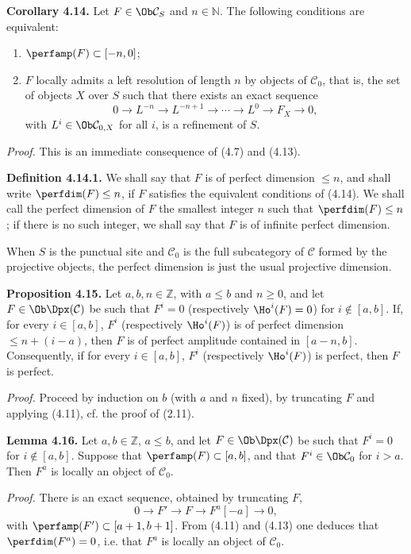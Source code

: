 \textbf{Corollary 4.14.} Let \(F\in\Ob\mathcal C_S\) and \(n\in\mathbb N\). The following conditions are equivalent:
\begin{enumerate}[label=(\roman*)]
\item \(\perfamp(F)\subset[-n,0]\);
\item \(F\) locally admits a left resolution of length \(n\) by objects of \(\mathcal C_0\), that is, the set of objects \(X\) over \(S\) such that there exists an exact sequence
\[
  0\longrightarrow L^{-n}\longrightarrow L^{-n+1}\longrightarrow \cdots
  \longrightarrow L^0\longrightarrow F_X\longrightarrow 0,
\]
with \(L^i\in\Ob\mathcal C_{0,X}\) for all \(i\), is a refinement of \(S\).
\end{enumerate}

\emph{Proof.} This is an immediate consequence of (4.7) and (4.13).

\textbf{Definition 4.14.1.} We shall say that \(F\) is of perfect dimension \(\leq n\), and shall write \(\perfdim(F)\leq n\), if \(F\) satisfies the equivalent conditions of (4.14). We shall call the perfect dimension of \(F\) the smallest integer \(n\) such that \(\perfdim(F)\leq n\); if there is no such integer, we shall say that \(F\) is of infinite perfect dimension.

When \(S\) is the punctual site and \(\mathcal C_0\) is the full subcategory of \(\mathcal C\) formed by the projective objects, the perfect dimension is just the usual projective dimension.

\textbf{Proposition 4.15.} Let \(a,b,n\in\mathbb Z\), with \(a\leq b\) and \(n\geq0\), and let \(F\in\Ob\Dpx(\mathcal C)\) be such that \(F^i=0\) (respectively \(\Ho^i(F)=0\)) for \(i\notin[a,b]\). If, for every \(i\in[a,b]\), \(F^i\) (respectively \(\Ho^i(F)\)) is of perfect dimension \(\leq n+(i-a)\), then \(F\) is of perfect amplitude contained in \([a-n,b]\). Consequently, if for every \(i\in[a,b]\), \(F^i\) (respectively \(\Ho^i(F)\)) is perfect, then \(F\) is perfect.

\emph{Proof.} Proceed by induction on \(b\) (with \(a\) and \(n\) fixed), by truncating \(F\) and applying (4.11), cf. the proof of (2.11).

\textbf{Lemma 4.16.} Let \(a,b\in\mathbb Z\), \(a\leq b\), and let \(F\in\Ob\Dpx(\mathcal C)\) be such that \(F^i=0\) for \(i\notin[a,b]\). Suppose that \(\perfamp(F)\subset[a,b]\), and that \(F^i\in\Ob\mathcal C_0\) for \(i>a\). Then \(F^a\) is locally an object of \(\mathcal C_0\).

\emph{Proof.} There is an exact sequence, obtained by truncating \(F\),
\[
  0\longrightarrow F'\longrightarrow F\longrightarrow F^a[-a]\longrightarrow 0,
\]
with \(\perfamp(F')\subset[a+1,b+1]\). From (4.11) and (4.13) one deduces that \(\perfdim(F^a)=0\), i.e. that \(F^a\) is locally an object of \(\mathcal C_0\).

